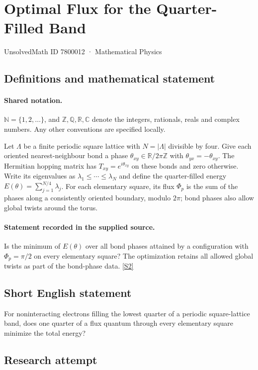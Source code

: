 \documentclass[11pt]{article}
\newcommand{\sref}[2]{\hyperlink{source:#1:#2}{[S#2]}}
\begin{document}
\setcounter{section}{7800011}
\section{Optimal Flux for the Quarter-Filled Band}\label{7800012}
{\small\sffamily UnsolvedMath ID 7800012 · Mathematical Physics}
\subsection{Definitions and mathematical statement}

\paragraph{Shared notation.}$\mathbb N=\{1,2,\ldots\}$, and $\mathbb Z,\mathbb Q,\mathbb R,\mathbb C$ denote the integers, rationals, reals and complex numbers. Any other conventions are specified locally.


Let $\Lambda$ be a finite periodic square lattice with $N=|\Lambda|$ divisible by four. Give each oriented nearest-neighbour bond a phase $\theta_{xy}\in\mathbb R/2\pi\mathbb Z$ with $\theta_{yx}=-\theta_{xy}$. The Hermitian hopping matrix has $T_{xy}=e^{i\theta_{xy}}$ on these bonds and zero otherwise. Write its eigenvalues as $\lambda_1\le\cdots\le\lambda_N$ and define the quarter-filled energy $E(\theta)=\sum_{j=1}^{N/4}\lambda_j$. For each elementary square, its flux $\Phi_p$ is the sum of the phases along a consistently oriented boundary, modulo $2\pi$; bond phases also allow global twists around the torus.
\paragraph{Statement recorded in the supplied source.}
Is the minimum of $E(\theta)$ over all bond phases attained by a configuration with $\Phi_p=\pi/2$ on every elementary square? The optimization retains all allowed global twists as part of the bond-phase data. \sref{7800012}{2}
\subsection{Short English statement}
For noninteracting electrons filling the lowest quarter of a periodic square-lattice band, does one quarter of a flux quantum through every elementary square minimize the total energy?
\subsection{Research attempt}
\end{document}
